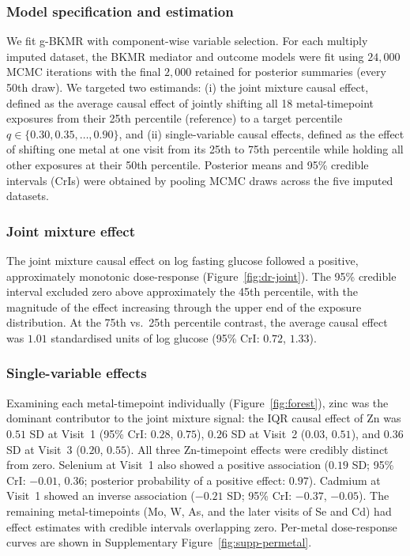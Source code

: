 \documentclass[11pt]{article}
\begin{document}
\subsubsection{Model specification and estimation}

We fit g-BKMR with component-wise variable selection. For each multiply imputed dataset, the BKMR mediator and outcome models were fit using $24{,}000$ MCMC iterations with the final $2{,}000$ retained for posterior summaries (every 50th draw). We targeted two estimands: (i) the joint mixture causal effect, defined as the average causal effect of jointly shifting all 18 metal-timepoint exposures from their 25th percentile (reference) to a target percentile $q \in \{0.30, 0.35, \ldots, 0.90\}$, and (ii) single-variable causal effects, defined as the effect of shifting one metal at one visit from its 25th to 75th percentile while holding all other exposures at their 50th percentile. Posterior means and 95\% credible intervals (CrIs) were obtained by pooling MCMC draws across the five imputed datasets.

\subsubsection{Joint mixture effect}

The joint mixture causal effect on log fasting glucose followed a positive, approximately monotonic dose-response (Figure~\ref{fig:dr-joint}). The 95\% credible interval excluded zero above approximately the 45th percentile, with the magnitude of the effect increasing through the upper end of the exposure distribution. At the 75th vs.\ 25th percentile contrast, the average causal effect was $1.01$ standardised units of log glucose (95\% CrI: $0.72$, $1.33$).

\subsubsection{Single-variable effects}

Examining each metal-timepoint individually (Figure~\ref{fig:forest}), zinc was the dominant contributor to the joint mixture signal: the IQR causal effect of Zn was $0.51$ SD at Visit~1 (95\% CrI: $0.28$, $0.75$), $0.26$ SD at Visit~2 ($0.03$, $0.51$), and $0.36$ SD at Visit~3 ($0.20$, $0.55$). All three Zn-timepoint effects were credibly distinct from zero. Selenium at Visit~1 also showed a positive association ($0.19$ SD; 95\% CrI: $-0.01$, $0.36$; posterior probability of a positive effect: $0.97$). Cadmium at Visit~1 showed an inverse association ($-0.21$ SD; 95\% CrI: $-0.37$, $-0.05$). The remaining metal-timepoints (Mo, W, As, and the later visits of Se and Cd) had effect estimates with credible intervals overlapping zero. Per-metal dose-response curves are shown in Supplementary Figure~\ref{fig:supp-permetal}.
\end{document}

